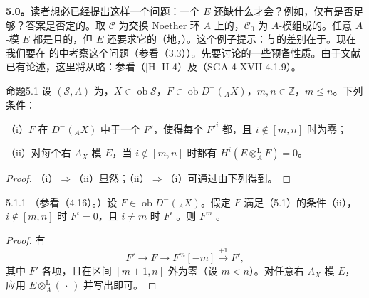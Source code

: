 \textbf{5.0。}读者想必已经提出这样一个问题：一个 $E$ 还缺什么才会？例如，仅有是否足够？答案是否定的。取 $\mathcal C$ 为交换 Noether 环 $A$ 上的，$\mathcal C_0$ 为 $A$-模组成的。任意 $A$-模 $E$ 都是且的，但 $E$ 还要求它的（地，）。这个例子提示：与的差别在于。现在我们要在
的中考察这个问题（参看（3.3））。先要讨论的一些预备性质。由于文献已有论述，这里将从略：参看（[H] II 4）及（SGA 4 XVII 4.1.9）。

\begin{SGAresult}{命题}{5.1}
设 $(\mathscr S,A)$ 为，$X\in\operatorname{ob}\mathscr S$，$F\in\operatorname{ob}D^-({}_AX)$，$m,n\in\mathbb Z$，$m\leq n$。下列条件：

（i）$F$ 在 $D^-({}_AX)$ 中于一个 $F'$，使得每个 $F'^i$ 都，且 $i\notin[m,n]$ 时为零；

（ii）对每个右 $A_X$-模 $E$，当 $i\notin[m,n]$ 时都有 $H^i(E\otimes_A^{\mathrm L}F)=0$。
\end{SGAresult}
\begin{proof}
（i）$\Rightarrow$（ii）显然；（ii）$\Rightarrow$（i）可通过由下列得到。
\end{proof}

\begin{SGAresult}{}{5.1.1}
（参看（4.16）。）设 $F\in\operatorname{ob}D^-({}_AX)$。假定 $F$ 满足（5.1）的条件（ii），$i\notin[m,n]$ 时 $F^i=0$，且 $i\ne m$ 时 $F^i$ 。则 $F^m$ 。
\end{SGAresult}
\begin{proof}
有
\[F'\longrightarrow F\longrightarrow F^m[-m]\xrightarrow{+1}F',\]
其中 $F'$ 各项，且在区间 $[m+1,n]$ 外为零（设 $m<n$）。对任意右 $A_X$-模 $E$，应用 $E\otimes_A^{\mathrm L}(\,\cdot\,)$ 并写出即可。
\end{proof}

